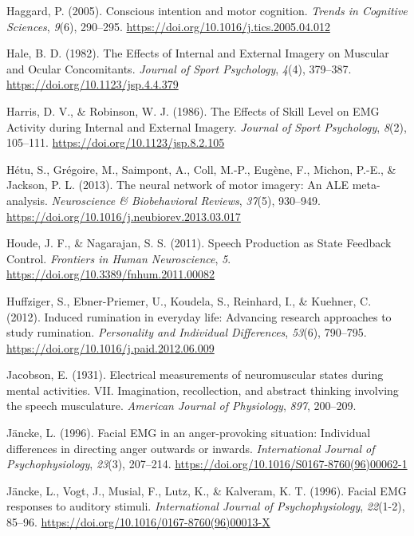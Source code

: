 \documentclass[a4paper,12pt,twoside,openright,oldfontcommands]{memoir}
\begin{document}
\hypertarget{ref-haggard_conscious_2005}{}
Haggard, P. (2005). Conscious intention and motor cognition.
\emph{Trends in Cognitive Sciences}, \emph{9}(6), 290--295.
\url{https://doi.org/10.1016/j.tics.2005.04.012}

\hypertarget{ref-hale_effects_1982}{}
Hale, B. D. (1982). The Effects of Internal and External Imagery on
Muscular and Ocular Concomitants. \emph{Journal of Sport Psychology},
\emph{4}(4), 379--387. \url{https://doi.org/10.1123/jsp.4.4.379}

\hypertarget{ref-harris_effects_1986}{}
Harris, D. V., \& Robinson, W. J. (1986). The Effects of Skill Level on
EMG Activity during Internal and External Imagery. \emph{Journal of
Sport Psychology}, \emph{8}(2), 105--111.
\url{https://doi.org/10.1123/jsp.8.2.105}

\hypertarget{ref-hetu_neural_2013}{}
Hétu, S., Grégoire, M., Saimpont, A., Coll, M.-P., Eugène, F., Michon,
P.-E., \& Jackson, P. L. (2013). The neural network of motor imagery: An
ALE meta-analysis. \emph{Neuroscience \& Biobehavioral Reviews},
\emph{37}(5), 930--949.
\url{https://doi.org/10.1016/j.neubiorev.2013.03.017}

\hypertarget{ref-houde_speech_2011}{}
Houde, J. F., \& Nagarajan, S. S. (2011). Speech Production as State
Feedback Control. \emph{Frontiers in Human Neuroscience}, \emph{5}.
\url{https://doi.org/10.3389/fnhum.2011.00082}

\hypertarget{ref-Huffziger2012}{}
Huffziger, S., Ebner-Priemer, U., Koudela, S., Reinhard, I., \& Kuehner,
C. (2012). Induced rumination in everyday life: Advancing research
approaches to study rumination. \emph{Personality and Individual
Differences}, \emph{53}(6), 790--795.
\url{https://doi.org/10.1016/j.paid.2012.06.009}

\hypertarget{ref-jacobson_electrical_1931}{}
Jacobson, E. (1931). Electrical measurements of neuromuscular states
during mental activities. VII. Imagination, recollection, and abstract
thinking involving the speech musculature. \emph{American Journal of
Physiology}, \emph{897}, 200--209.

\hypertarget{ref-Jancke1996a}{}
Jäncke, L. (1996). Facial EMG in an anger-provoking situation:
Individual differences in directing anger outwards or inwards.
\emph{International Journal of Psychophysiology}, \emph{23}(3),
207--214. \url{https://doi.org/10.1016/S0167-8760(96)00062-1}

\hypertarget{ref-Jancke1996}{}
Jäncke, L., Vogt, J., Musial, F., Lutz, K., \& Kalveram, K. T. (1996).
Facial EMG responses to auditory stimuli. \emph{International Journal of
Psychophysiology}, \emph{22}(1-2), 85--96.
\url{https://doi.org/10.1016/0167-8760(96)00013-X}
\end{document}
